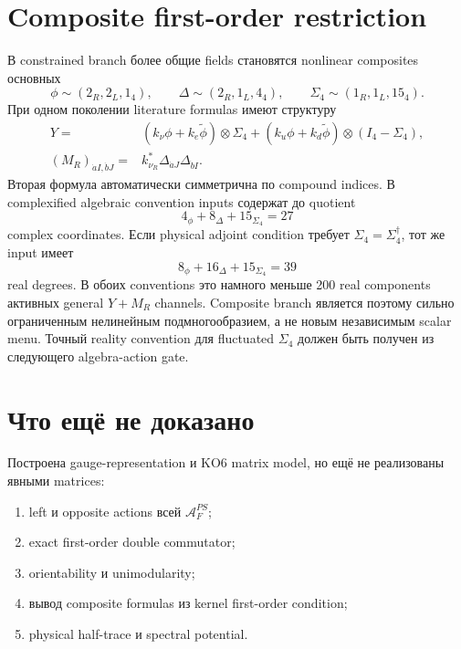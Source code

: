 \section{Composite first-order restriction}

В constrained branch более общие fields становятся nonlinear composites
основных
\begin{equation}
 \phi\sim(2_R,2_L,1_4),
 \qquad
 \Delta\sim(2_R,1_L,4_4),
 \qquad
 \Sigma_4\sim(1_R,1_L,15_4).
\end{equation}
При одном поколении literature formulas имеют структуру
\begin{align}
 Y={}&(k_\nu\phi+k_e\widetilde\phi)\otimes\Sigma_4
 +(k_u\phi+k_d\widetilde\phi)\otimes(I_4-\Sigma_4),\\
 (M_R)_{\dot aI,\dot bJ}={}&
 k_{\nu_R}^*\Delta_{\dot aJ}\Delta_{\dot bI}.
\end{align}
Вторая формула автоматически симметрична по compound indices. В
complexified algebraic convention inputs содержат до quotient
\begin{equation}
 4_\phi+8_\Delta+15_{\Sigma_4}=27
\end{equation}
complex coordinates. Если physical adjoint condition требует
\(\Sigma_4=\Sigma_4^\dagger\), тот же input имеет
\begin{equation}
 8_\phi+16_\Delta+15_{\Sigma_4}=39
\end{equation}
real degrees. В обоих conventions это намного меньше 200 real components
активных general \(Y+M_R\) channels. Composite branch является поэтому
сильно ограниченным нелинейным подмногообразием, а не новым независимым
scalar menu. Точный reality convention для fluctuated \(\Sigma_4\) должен
быть получен из следующего algebra-action gate.

\section{Что ещё не доказано}

Построена gauge-representation и KO6 matrix model, но ещё не реализованы
явными matrices:
\begin{enumerate}
 \item left и opposite actions всей \(\mathcal A_F^{PS}\);
 \item exact first-order double commutator;
 \item orientability и unimodularity;
 \item вывод composite formulas из kernel first-order condition;
 \item physical half-trace и spectral potential.
\end{enumerate}

